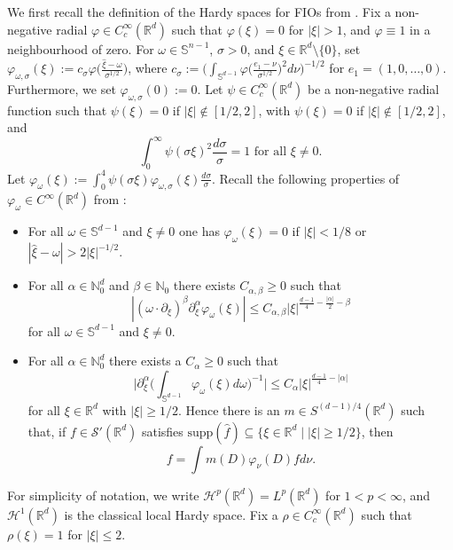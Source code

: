 \documentclass{amsart}
\theoremstyle{definition}
\newcommand{\R}{\mathbb{R}}
\newcommand{\N}{\mathbb{N}}
\newcommand {\Rd}{\mathbb{R}^{d}}
\newcommand {\w}{\omega}
\newcommand {\ph}{\varphi}
\numberwithin{equation}{section}
\begin{document}
We first recall the definition of the Hardy spaces for FIOs from  \cite{Smith1998,HassellPortalRozendaal2020}. Fix a non-negative radial $\varphi \in C^\infty_c(\R^d)$ such that $\varphi(\xi) = 0$ for $|\xi| > 1$, and $\varphi \equiv 1$ in a neighbourhood of zero. For $\omega \in \mathbb{S}^{n-1}$, $\sigma > 0$, and $\xi \in \R^d \setminus \{0\}$, set $\varphi_{\omega,\sigma}(\xi) := c_\sigma \varphi \big( \frac{\hat{\xi} - \omega}{\sigma^{1/2}} \big)$, where $c_\sigma := \big( \int_{\mathbb{S}^{d-1}} \varphi \big( \frac{e_1 - \nu}{\sigma^{1/2}} \big)^2 d\nu \big)^{-1/2}$ for $e_1 = (1,0,\ldots,0)$. Furthermore, we set $\varphi_{\omega,\sigma}(0) := 0$. Let $\psi \in C^\infty_c(\R^d)$ be a non-negative radial function such that $\psi(\xi) = 0$ if $|\xi| \notin [1/2,2]$, with $\psi(\xi) = 0$ if $|\xi| \notin [1/2,2]$, and
\begin{equation*}
\int_0^\infty \psi(\sigma \xi)^2 \frac{d \sigma}{\sigma} = 1 \text{ for all } \xi \neq 0.
\end{equation*}
Let $\varphi_\omega(\xi) := \int_0^4 \psi(\sigma \xi) \varphi_{\omega, \sigma}(\xi) \frac{d \sigma}{\sigma}$. Recall the following properties of $\ph_{\w}\in C^{\infty}(\Rd)$ from \cite[Remark 3.3]{Rozendaal2021}:
\begin{itemize}
\item[(1)] For all $\omega \in \mathbb{S}^{d-1}$ and $\xi \neq 0$ one has $\varphi_\omega(\xi) = 0$ if $|\xi| < 1/8$ or $|\hat{\xi} - \omega| > 2 |\xi|^{-1/2}$.
\item[(2)] For all $\alpha \in \N^d_0$ and $\beta \in \N_0$ there exists $C_{\alpha,\beta} \geq 0$ such that
\begin{equation*}
| (\omega \cdot \partial_\xi)^\beta \partial_\xi^\alpha \varphi_\omega(\xi)| \leq C_{\alpha,\beta} |\xi|^{\frac{d-1}{4}-\frac{|\alpha|}{2}-\beta}
\end{equation*}
for all $\omega \in \mathbb{S}^{d-1}$ and $\xi \neq 0$.
\item[(3)] For all $\alpha \in \N^d_0$ there exists a $C_\alpha \geq 0$ such that
\begin{equation*}
\Big| \partial_\xi^\alpha \Big( \int_{\mathbb{S}^{d-1}} \varphi_\omega(\xi) d\omega \Big)^{-1} \Big| \leq C_\alpha |\xi|^{\frac{d-1}{4}-|\alpha|}
\end{equation*}
for all $\xi \in \R^d$ with $|\xi| \geq 1/2$. Hence there is an $m \in S^{(d-1)/4}(\R^d)$ such that, if $f \in \mathcal{S}'(\R^d)$ satisfies $\text{supp}(\hat{f}) \subseteq \{ \xi \in \Rd\mid |\xi| \geq 1/2 \}$, then
\begin{equation}\label{eq:repro}
f = \int m(D) \varphi_\nu(D) f d\nu.
\end{equation}
\end{itemize}
For simplicity of notation, we write $\mathcal{H}^p(\R^d) = L^p(\R^d)$ for $1<p<\infty$, and 
$\mathcal{H}^1(\R^d)$ is the classical local Hardy space.  Fix a $\rho\in C^{\infty}_{c}(\Rd)$ such that $\rho(\xi)=1$ for $|\xi|\leq 2$.
\end{document}
